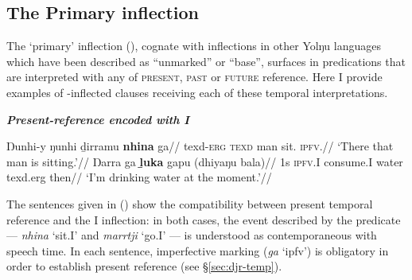 %

\subsection{The Primary inflection}\label{desc-i}

The `primary' inflection (\I), cognate with inflections in other Yolŋu languages which have been described as ``unmarked'' or ``base'', surfaces in predications that are interpreted with any of \textsc{present}, \textsc{past} or \textsc{future} reference. Here I provide examples of \I-inflected clauses receiving each of these temporal interpretations.

\pex\textit{\textbf{ Present-reference encoded with \gls{I}}}

\a\begingl{}
\gla Ŋunhi-y ŋunhi ḏirramu \textbf{nhina} ga//
\glb \gls{texd}\textsc{-erg} \textsc{texd} man sit.\I{} \textsc{ipfv.\I}//
\glft`There that man is sitting.'// 
\endgl
\a\begingl\gla Ŋarra ga \textbf{ḻuka} gapu (dhiyaŋu bala)//
\glb 1s \textsc{ipfv.\gls{I}} consume.\gls{I} water \gls{texd}.\gls{erg} then//
\glft`I'm drinking water at the moment.'\trailingcitation{[DhG 20190405]}//\endgl
\xe

The sentences given in () show the compatibility between present temporal reference and the \gls{I} inflection: in both cases, the event described by the predicate --- \textit{nhina} `sit.\gls{I}' and \textit{marrtji} `go.\gls{I}' --- is understood as contemporaneous with speech time. In each sentence, imperfective marking (\textit{ga} `\gls{ipfv}') is obligatory in order to establish present reference (see \S \ref{sec:djr-temp}).



